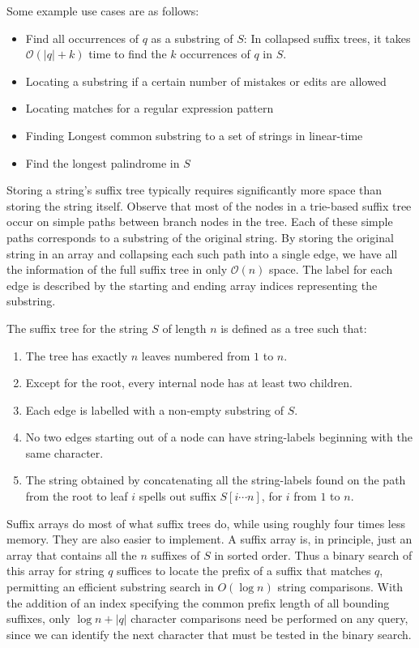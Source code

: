 \documentclass{article}
\newcommand{\bigO}{\mathcal{O}}
\begin{document}
    Some example use cases are as follows:
    \begin{itemize}
        \item Find all occurrences of $q$ as a substring of $S$: In collapsed suffix trees, it takes $\bigO(|q| + k)$ time to find the $k$ occurrences of $q$ in $S$.
        \item Locating a substring if a certain number of mistakes or edits are allowed
        \item Locating matches for a regular expression pattern
        \item Finding Longest common substring to a set of strings in linear-time
        \item Find the longest palindrome in $S$
    \end{itemize}
    
    Storing a string's suffix tree typically requires significantly more space than storing the string itself. Observe that most of the nodes in a trie-based suffix tree occur on simple paths between branch nodes in the tree. Each of these simple paths corresponds to a substring of the original string. By storing the original string in an array and collapsing each such path into a single edge, we have all the information of the full suffix tree in only $\bigO(n)$ space. The label for each edge is described by the starting and ending array indices representing the substring. 
    
    The suffix tree for the string $S$ of length $n$ is defined as a tree such that:
    \begin{enumerate}
        \item The tree has exactly $n$ leaves numbered from $1$ to $n$.
        \item Except for the root, every internal node has at least two children.
        \item Each edge is labelled with a non-empty substring of $S$.
        \item No two edges starting out of a node can have string-labels beginning with the same character.
        \item The string obtained by concatenating all the string-labels found on the path from the root to leaf $i$ spells out suffix $S[i \cdots n]$, for $i$ from $1$ to $n$.
    \end{enumerate}
    Suffix arrays do most of what suffix trees do, while using roughly four times less memory. They are also easier to implement. A suffix array is, in principle, just an array that contains all the $n$ suffixes of $S$ in sorted order. Thus a binary search of this array for string $q$ suffices to locate the prefix of a suffix that matches $q$, permitting an efficient substring search in $O(\log n)$ string comparisons. With the addition of an index specifying the common prefix length of all bounding suffixes, only $\log n+|q|$ character comparisons need be performed on any query, since we can identify the next character that must be tested in the binary search.
    
\end{document}
